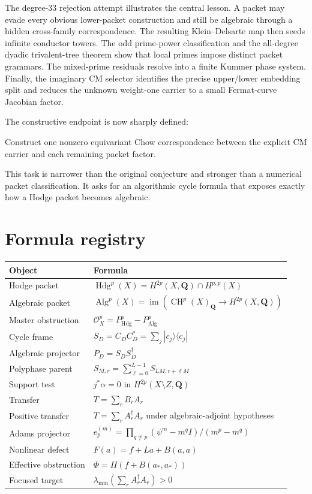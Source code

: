 \documentclass[11pt,oneside]{book}
\theoremstyle{definition}
\theoremstyle{remark}
\newcommand{\Hdg}{\operatorname{Hdg}}
\newcommand{\Alg}{\operatorname{Alg}}
\newcommand{\CH}{\operatorname{CH}}
\newcommand{\im}{\operatorname{im}}
\newcommand{\Q}{\mathbf{Q}}
\begin{document}
The degree-33 rejection attempt illustrates the central lesson. A packet may evade every obvious lower-packet construction and still be algebraic through a hidden cross-family correspondence. The resulting Klein--Delsarte map then seeds infinite conductor towers. The odd prime-power classification and the all-degree dyadic trivalent-tree theorem show that local primes impose distinct packet grammars. The mixed-prime residuals resolve into a finite Kummer phase system. Finally, the imaginary CM selector identifies the precise upper/lower embedding split and reduces the unknown weight-one carrier to a small Fermat-curve Jacobian factor.

The constructive endpoint is now sharply defined:
\begin{resultbox}
Construct one nonzero equivariant Chow correspondence between the explicit CM carrier and each remaining packet factor.
\end{resultbox}
This task is narrower than the original conjecture and stronger than a numerical packet classification. It asks for an algorithmic cycle formula that exposes exactly how a Hodge packet becomes algebraic.



\appendix
\chapter{Formula registry}
\begin{longtable}{p{}p{}}
\toprule
Object & Formula \\
\midrule
Hodge packet & $\Hdg^p(X)=H^{2p}(X,\Q)\cap H^{p,p}(X)$ \\
Algebraic packet & $\Alg^p(X)=\im(\CH^p(X)_\Q\to H^{2p}(X,\Q))$ \\
Master obstruction & $\mathcal O_X^p=P_{\Hdg}^p-P_{\Alg}^p$ \\
Cycle frame & $S_D=C_DC_D^*=\sum_j|c_j\rangle\langle c_j|$ \\
Algebraic projector & $P_D=S_DS_D^\dagger$ \\
Polyphase parent & $S_{M,r}=\sum_{\ell=0}^{L-1}S_{LM,r+\ell M}$ \\
Support test & $j^*\alpha=0$ in $H^{2p}(X\setminus Z,\Q)$ \\
Transfer & $T=\sum_rB_rA_r$ \\
Positive transfer & $T=\sum_rA_r^\dagger A_r$ under algebraic-adjoint hypotheses \\
Adams projector & $e_p^{(m)}=\prod_{q\ne p}(\psi^m-m^qI)/(m^p-m^q)$ \\
Nonlinear defect & $F(a)=f+La+B(a,a)$ \\
Effective obstruction & $\Phi=\Pi(f+B(a_*,a_*))$ \\
Focused target & $\lambda_{\min}(\sum_rA_r^\dagger A_r)>0$ \\
\bottomrule
\end{longtable}
\end{document}
